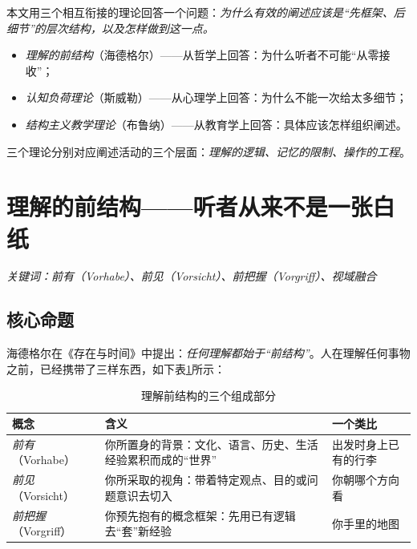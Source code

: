 本文用三个相互衔接的理论回答一个问题：\textit{为什么有效的阐述应该是“先框架、后细节”的层次结构，以及怎样做到这一点。}
\begin{itemize}
    \item \textit{理解的前结构}（海德格尔）——从哲学上回答：为什么听者不可能“从零接收”；
    \item \textit{认知负荷理论}（斯威勒）——从心理学上回答：为什么不能一次给太多细节；
    \item \textit{结构主义教学理论}（布鲁纳）——从教育学上回答：具体应该怎样组织阐述。
\end{itemize}

\nid 三个理论分别对应阐述活动的三个层面：\textit{理解的逻辑、记忆的限制、操作的工程}。

\section{理解的前结构——听者从来不是一张白纸}

\nid\textit{关键词：前有（Vorhabe）、前见（Vorsicht）、前把握（Vorgriff）、视域融合}

\subsection{核心命题}

海德格尔在《存在与时间》中提出：\textit{任何理解都始于“前结构”}。人在理解任何事物之前，已经携带了三样东西，如下表\ref{tab:fore-structure}所示：

\begin{table}[htbp]
    \centering
    \caption{理解前结构的三个组成部分}
    \label{tab:fore-structure}
    \begin{tabularx}{\textwidth}{l >{\raggedright\arraybackslash}X >{\raggedright\arraybackslash}X}
        \toprule
        \textbf{概念} & \textbf{含义} & \textbf{一个类比} \\
        \midrule
        \textit{前有}（Vorhabe） & 你所置身的背景：文化、语言、历史、生活经验累积而成的“世界” & 出发时身上已有的行李 \\
        \textit{前见}（Vorsicht） & 你所采取的视角：带着特定观点、目的或问题意识去切入 & 你朝哪个方向看 \\
        \textit{前把握}（Vorgriff） & 你预先抱有的概念框架：先用已有逻辑去“套”新经验 & 你手里的地图 \\
        \bottomrule
    \end{tabularx}
\end{table}

